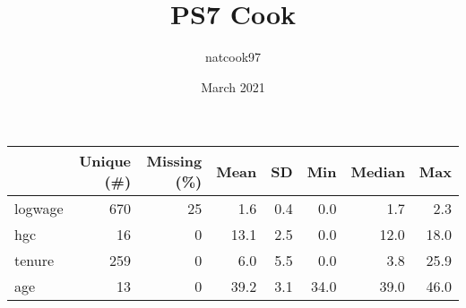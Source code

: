 \documentclass{article}
\title{PS7 Cook}
\author{natcook97 }
\date{March 2021}
\begin{document}
\maketitle
\begin{table}
\centering
\begin{tabular}[t]{lrrrrrrr}
\toprule
  & Unique (\#) & Missing (\%) & Mean & SD & Min & Median & Max\\
\midrule
logwage & 670 & 25 & 1.6 & 0.4 & 0.0 & 1.7 & 2.3\\
hgc & 16 & 0 & 13.1 & 2.5 & 0.0 & 12.0 & 18.0\\
tenure & 259 & 0 & 6.0 & 5.5 & 0.0 & 3.8 & 25.9\\
age & 13 & 0 & 39.2 & 3.1 & 34.0 & 39.0 & 46.0\\
\bottomrule
\end{tabular}
\end{table}
\end{document}
